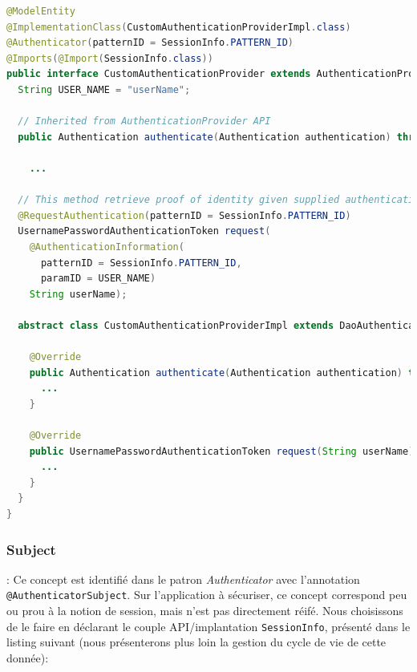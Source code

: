 \begin{lstlisting}[language=Java,basicstyle=\ttfamily\footnotesize, caption=Mise en oeuvre de l'entité \textit{Authenticator} : \texttt{CustomAuthenticationProvider.java},label=listing:CustomAuthenticationProvider]
@ModelEntity
@ImplementationClass(CustomAuthenticationProviderImpl.class)
@Authenticator(patternID = SessionInfo.PATTERN_ID)
@Imports(@Import(SessionInfo.class))
public interface CustomAuthenticationProvider extends AuthenticationProvider {
  String USER_NAME = "userName";

  // Inherited from AuthenticationProvider API
  public Authentication authenticate(Authentication authentication) throws AuthenticationException;

    ...

  // This method retrieve proof of identity given supplied authentication information
  @RequestAuthentication(patternID = SessionInfo.PATTERN_ID)
  UsernamePasswordAuthenticationToken request(
    @AuthenticationInformation(
      patternID = SessionInfo.PATTERN_ID, 
      paramID = USER_NAME) 
    String userName);

  abstract class CustomAuthenticationProviderImpl extends DaoAuthenticationProvider implements CustomAuthenticationProvider {

    @Override
    public Authentication authenticate(Authentication authentication) throws AuthenticationException {
      ...
    }

    @Override
    public UsernamePasswordAuthenticationToken request(String userName) {
      ...
    }
  }
}
\end{lstlisting}

\subsubsection{Subject} : Ce concept est identifié dans le patron \textit{Authenticator} avec l'annotation \texttt{@AuthenticatorSubject}. Sur l'application à sécuriser, ce concept correspond peu ou prou à la notion de session, mais n'est pas directement réifé. Nous choisissons de le faire en déclarant le couple API/implantation \texttt{SessionInfo}, présenté dans le listing suivant (nous présenterons plus loin la gestion du cycle de vie de cette donnée):

